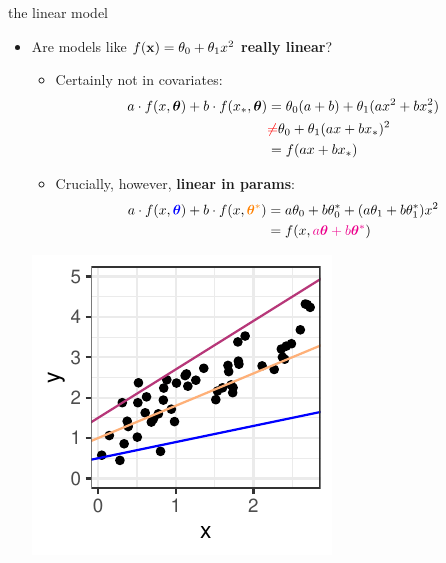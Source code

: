 \documentclass[11pt,compress,t,notes=noshow, xcolor=table]{beamer}
\begin{document}
\begin{vbframe}{the linear model}

\begin{itemize}
\item Are models like $f(\mathbf{x}) = \theta_0 + \theta_1 x^2$
  \textbf{really linear}?
\begin{minipage}[b]{0.7\textwidth}
  \vspace{0.3cm}
  \begin{itemize}
    \item Certainly not in covariates:
    \scriptsize
    \begin{align*}
      a \cdot f(x, \bm{\theta}) + b \cdot f(x_\ast, \bm{\theta})
      &= \theta_0 (a + b) + \theta_1(a x^2 + b x_\ast^2) \\
      &\textcolor{red}{\neq} \theta_0 + \theta_1 (a x + b  x_\ast)^2\\
      &= f(a  x + b x_\ast)
    \end{align*}
    \normalsize
    \item Crucially, however, \textbf{linear in params}:
    \scriptsize
    \begin{align*}
      a \cdot f(x, \textcolor{blue}{\bm{\theta}}) +
      b \cdot f(x, \textcolor{orange}{\bm{\theta}^\ast})
      &= a \theta_0 + b \theta_0^\ast + (a \theta_1 + b \theta_1^\ast) x^2 \\
      &= f(x, \textcolor{magenta}{a \bm{\theta} + b \bm{\theta}^\ast})
    \end{align*}
  \end{itemize}
\end{minipage}
\begin{minipage}[b]{0.2\textwidth}
  \includegraphics[width=\textwidth]{figure/reg_poly_linearity}

\end{minipage}
\end{itemize}
\end{vbframe}
\end{document}
